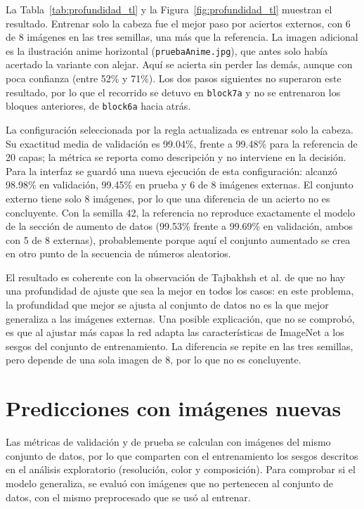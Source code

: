 \documentclass[letterpaper, 10 pt]{IEEEconf}
\begin{document}
La Tabla~\ref{tab:profundidad_tl} y la Figura~\ref{fig:profundidad_tl} muestran el resultado. Entrenar solo la cabeza fue el mejor paso por aciertos externos, con 6 de 8 imágenes en las tres semillas, una más que la referencia. La imagen adicional es la ilustración anime horizontal (\texttt{pruebaAnime.jpg}), que antes solo había acertado la variante con alejar. Aquí se acierta sin perder las demás, aunque con poca confianza (entre 52\% y 71\%). Los dos pasos siguientes no superaron este resultado, por lo que el recorrido se detuvo en \texttt{block7a} y no se entrenaron los bloques anteriores, de \texttt{block6a} hacia atrás.

La configuración seleccionada por la regla actualizada es entrenar solo la cabeza. Su exactitud media de validación es 99.04\%, frente a 99.48\% para la referencia de 20 capas; la métrica se reporta como descripción y no interviene en la decisión. Para la interfaz se guardó una nueva ejecución de esta configuración: alcanzó 98.98\% en validación, 99.45\% en prueba y 6 de 8 imágenes externas. El conjunto externo tiene solo 8 imágenes, por lo que una diferencia de un acierto no es concluyente. Con la semilla 42, la referencia no reproduce exactamente el modelo de la sección de aumento de datos (99.53\% frente a 99.69\% en validación, ambos con 5 de 8 externas), probablemente porque aquí el conjunto aumentado se crea en otro punto de la secuencia de números aleatorios.

El resultado es coherente con la observación de Tajbakhsh et al. de que no hay una profundidad de ajuste que sea la mejor en todos los casos: en este problema, la profundidad que mejor se ajusta al conjunto de datos no es la que mejor generaliza a las imágenes externas. Una posible explicación, que no se comprobó, es que al ajustar más capas la red adapta las características de ImageNet a los sesgos del conjunto de entrenamiento. La diferencia se repite en las tres semillas, pero depende de una sola imagen de 8, por lo que no es concluyente.


\section{Predicciones con imágenes nuevas}

Las métricas de validación y de prueba se calculan con imágenes del mismo conjunto de datos, por lo que comparten con el entrenamiento los sesgos descritos en el análisis exploratorio (resolución, color y composición). Para comprobar si el modelo generaliza, se evaluó con imágenes que no pertenecen al conjunto de datos, con el mismo preprocesado que se usó al entrenar.
\end{document}
